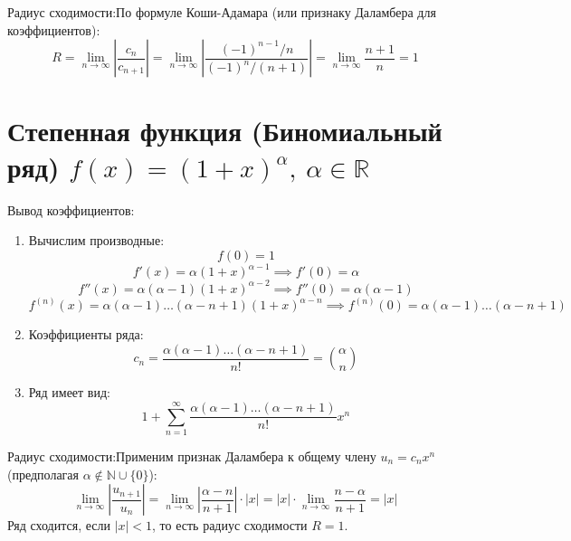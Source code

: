\documentclass[14pt]{extreport}
\begin{document}
    Радиус сходимости:По формуле Коши-Адамара (или признаку Даламбера для коэффициентов):$$R = \lim_{n \to \infty} \left| \frac{c_n}{c_{n+1}} \right| = \lim_{n \to \infty} \left| \frac{(-1)^{n-1}/n}{(-1)^n/(n+1)} \right| = \lim_{n \to \infty} \frac{n+1}{n} = 1$$

    \section{Степенная функция (Биномиальный ряд) $f(x) = (1 + x)^\alpha, \ \alpha \in \mathbb{R}$}

    Вывод коэффициентов:
    \begin{enumerate}
        \item Вычислим производные:
        $$f(0) = 1$$$$f'(x) = \alpha(1+x)^{\alpha-1} \implies f'(0) = \alpha$$$$f''(x) = \alpha(\alpha-1)(1+x)^{\alpha-2} \implies f''(0) = \alpha(\alpha-1)$$$$f^{(n)}(x) = \alpha(\alpha-1)\dots(\alpha-n+1)(1+x)^{\alpha-n} \implies f^{(n)}(0) = \alpha(\alpha-1)\dots(\alpha-n+1)$$
        \item Коэффициенты ряда:$$c_n = \frac{\alpha(\alpha-1)\dots(\alpha-n+1)}{n!} = \binom{\alpha}{n}$$
        \item Ряд имеет вид:$$1 + \sum_{n=1}^{\infty} \frac{\alpha(\alpha-1)\dots(\alpha-n+1)}{n!} x^n$$
    \end{enumerate}

    Радиус сходимости:Применим признак Даламбера к общему члену $u_n = c_n x^n$ (предполагая $\alpha \notin \mathbb{N} \cup \{0\}$):$$\lim_{n \to \infty} \left| \frac{u_{n+1}}{u_n} \right| = \lim_{n \to \infty} \left| \frac{\alpha-n}{n+1} \right| \cdot |x| = |x| \cdot \lim_{n \to \infty} \frac{n - \alpha}{n+1} = |x|$$Ряд сходится, если $|x| < 1$, то есть радиус сходимости $R = 1$.
\end{document}
